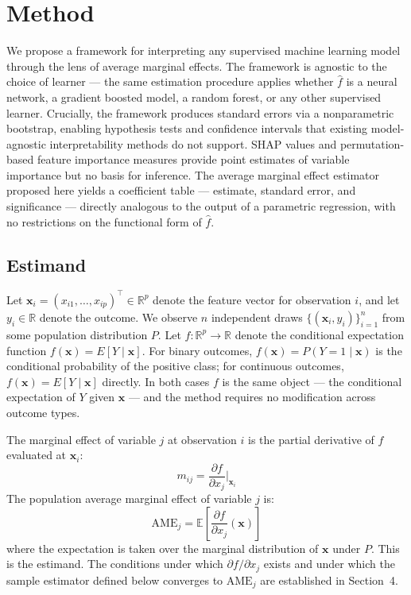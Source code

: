 \documentclass[12pt]{article}
\begin{document}
	\section{Method}
	
	We propose a framework for interpreting any supervised machine learning model through the lens of average marginal effects. The framework is agnostic to the choice of learner --- the same estimation procedure applies whether $\hat{f}$ is a neural network, a gradient boosted model, a random forest, or any other supervised learner. Crucially, the framework produces standard errors via a nonparametric bootstrap, enabling hypothesis tests and confidence intervals that existing model-agnostic interpretability methods do not support. SHAP values and permutation-based feature importance measures provide point estimates of variable importance but no basis for inference. The average marginal effect estimator proposed here yields a coefficient table --- estimate, standard error, and significance --- directly analogous to the output of a parametric regression, with no restrictions on the functional form of $\hat{f}$.
	
	\subsection{Estimand}
	
	Let $\mathbf{x}_i = (x_{i1}, \dots, x_{ip})^\top \in \mathbb{R}^p$ denote the feature vector for observation $i$, and let $y_i \in \mathbb{R}$ denote the outcome. We observe $n$ independent draws $\{(\mathbf{x}_i, y_i)\}_{i=1}^n$ from some population distribution $P$. Let $f: \mathbb{R}^p \to \mathbb{R}$ denote the conditional expectation function $f(\mathbf{x}) = E[Y \mid \mathbf{x}]$. For binary outcomes, $f(\mathbf{x}) = P(Y = 1 \mid \mathbf{x})$ is the conditional probability of the positive class; for continuous outcomes, $f(\mathbf{x}) = E[Y \mid \mathbf{x}]$ directly. In both cases $f$ is the same object --- the conditional expectation of $Y$ given $\mathbf{x}$ --- and the method requires no modification across outcome types.
	
	The marginal effect of variable $j$ at observation $i$ is the partial derivative of $f$ evaluated at $\mathbf{x}_i$:
	\begin{equation}
		m_{ij} = \frac{\partial f}{\partial x_j}\bigg|_{\mathbf{x}_i}
	\end{equation}
	The population average marginal effect of variable $j$ is:
	\begin{equation}
		\mathrm{AME}_j = \mathbb{E}\left[\frac{\partial f}{\partial x_j}(\mathbf{x})\right]
	\end{equation}
	where the expectation is taken over the marginal distribution of $\mathbf{x}$ under $P$. This is the estimand. The conditions under which $\partial f / \partial x_j$ exists and under which the sample estimator defined below converges to $\mathrm{AME}_j$ are established in Section~4.
	
\end{document}

